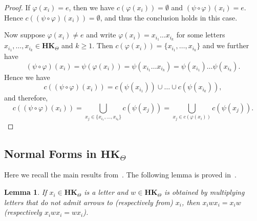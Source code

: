 \documentclass[pdflatex,sn-mathphys-num]{sn-jnl}
\newcommand{\hk}{\mathbf{HK}_{\Theta}}
\newcommand{\vp}{\varphi}
\newtheorem{lemma}[theorem]{Lemma}
\theoremstyle{definition}
\theoremstyle{remark}
\begin{document}
\begin{proof}
   If $\vp(x_i) = e$, then we have $c(\vp(x_i)) = \emptyset$ and $(\psi \circ \vp)(x_i) = e$.
   Hence $c((\psi \circ \vp)(x_i)) = \emptyset$, and thus the conclusion holds in this case.
   
   Now suppose $\vp(x_i) \neq e$ and write $\vp(x_i) = x_{i_1} \dots x_{i_k}$ for some letters $x_{i_1}, \dots, x_{i_k} \in \hk$ and $k \geq 1$.
   Then $c(\vp(x_i)) = \{x_{i_1}, \dots, x_{i_k}\}$ and we further have
   \[
   (\psi \circ \vp)(x_i) = \psi(\vp(x_i)) = \psi(x_{i_1} \dots x_{i_k}) = \psi(x_{i_1}) \dots \psi(x_{i_k}).
   \]
   Hence we have 
   \[
   c((\psi \circ \vp)(x_i)) = c(\psi(x_{i_1})) \cup \dots \cup c(\psi(x_{i_k})),
   \]
   and therefore, 
   \[
   c((\psi \circ \vp)(x_i)) = \bigcup_{x_j \in \{x_{i_1}, \dots, x_{i_k}\}} c(\psi(x_j)) = \bigcup_{x_j \in c(\vp(x_i))} c(\psi(x_j)).
   \]
\end{proof}




















\subsection{Normal Forms in $\hk$}\label{NF}

Here we recall the main results from~\cite{aragona20}.
The following lemma is proved in~\cite[Lemma~1]{aragona20}.
\begin{lemma}\label{NF:lemma1}
   If $x_i \in \hk$ is a letter and $w \in \hk$ is obtained by multiplying letters that do not admit arrows to (respectively from) $x_i$,
   then $x_i w x_i = x_i w$ (respectively $x_i w x_i = w x_i$).
\end{lemma}
\end{document}
